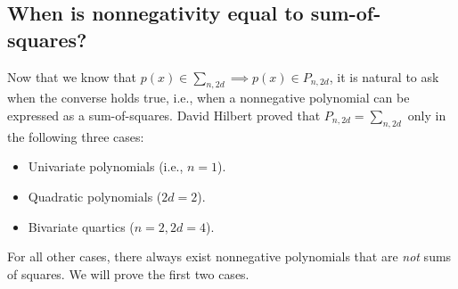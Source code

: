 	
			
			
			
			
			
	
	\subsection{When is nonnegativity equal to sum-of-squares?}
	
	Now that we know that $p(x) \in \sum_{n, 2d} \implies p(x) \in P_{n,2d}$, it is natural to ask when the converse holds true, i.e., when a nonnegative polynomial can be expressed as a sum-of-squares. David Hilbert proved that $P_{n,2d} = \sum_{n,2d}$ only in the following three cases:
	\begin{itemize}
		\item Univariate polynomials (i.e., $n = 1$).
		
		\item Quadratic polynomials ($2d = 2$).
		
		\item Bivariate quartics ($n = 2, 2d = 4$). 
	\end{itemize}
	For all other cases, there always exist nonnegative polynomials that are \emph{not} sums of squares. We will prove the first two cases. 
	
